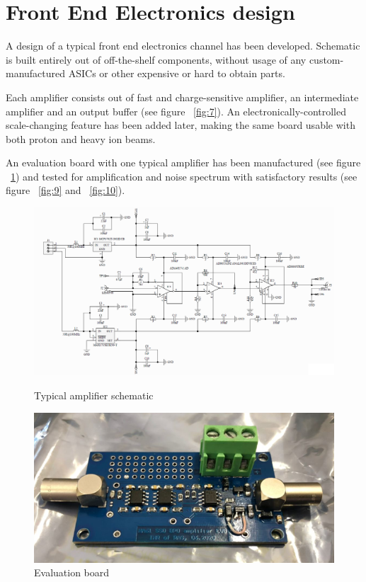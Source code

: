 \documentclass[a4paper]{jpconf}
\begin{document}
\section{Front End Electronics design}
A design of a typical front end electronics channel has been developed. Schematic is built entirely out of off-the-shelf components, without usage of any custom-manufactured ASICs or other expensive or hard to obtain parts.

Each amplifier consists out of fast and charge-sensitive amplifier, an intermediate amplifier and an output buffer (see figure ~\ref{fig:7}). An electronically-controlled scale-changing feature has been added later, making the same board usable with both proton and heavy ion beams.

An evaluation board with one typical amplifier has been manufactured (see figure ~\ref{fig:8}) and tested for amplification and noise spectrum with satisfactory results (see figure ~\ref{fig:9} and ~\ref{fig:10}).

\begin{figure}[htbp]
	\begin{minipage}{18pc}
		\includegraphics[width=\textwidth]{schematic.png}
		\caption{\label{fig:7} Typical amplifier schematic}
	\end{minipage}\hspace{2pc}
	\begin{minipage}{18pc}
		\includegraphics[width=\textwidth]{amp_photo.png}
		\caption{\label{fig:8} Evaluation board}
	\end{minipage} 
\end{figure}
\end{document}
